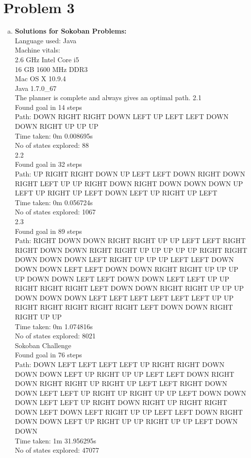 \documentclass[]{article}
\begin{document}
\section{Problem 3}
	\begin{enumerate}[(a)]
		\item \textbf{Solutions for Sokoban Problems:}\\
		Language used: Java\\
		
		Machine vitals:\\
		2.6 GHz Intel Core i5\\
		16 GB 1600 MHz DDR3\\
		Mac OS X 10.9.4\\
		Java 1.7.0\_67\\
		
		The planner is complete and always gives an optimal path.
		2.1\\
		Found goal in 14 steps\\
		Path: DOWN RIGHT RIGHT DOWN LEFT UP LEFT LEFT DOWN DOWN RIGHT UP UP UP\\
		Time taken: 0m 0.008695s\\
		No of states explored: 88\\
		
		2.2\\
		Found goal in 32 steps\\
		Path: UP RIGHT RIGHT DOWN UP LEFT LEFT DOWN RIGHT DOWN RIGHT LEFT UP UP RIGHT DOWN RIGHT DOWN DOWN DOWN UP LEFT UP RIGHT UP LEFT DOWN LEFT UP RIGHT UP LEFT\\
		Time taken: 0m 0.056724s\\
		No of states explored: 1067\\
		
		2.3\\
		Found goal in 89 steps\\
		Path: RIGHT DOWN DOWN RIGHT RIGHT UP UP LEFT LEFT RIGHT RIGHT DOWN DOWN RIGHT RIGHT UP UP UP UP UP RIGHT RIGHT DOWN DOWN DOWN LEFT RIGHT UP UP UP LEFT LEFT DOWN DOWN DOWN LEFT LEFT DOWN DOWN RIGHT RIGHT UP UP UP UP DOWN DOWN LEFT LEFT DOWN DOWN LEFT LEFT UP UP RIGHT RIGHT RIGHT LEFT DOWN DOWN RIGHT RIGHT UP UP UP DOWN DOWN DOWN LEFT LEFT LEFT LEFT LEFT LEFT UP UP RIGHT RIGHT RIGHT RIGHT RIGHT LEFT DOWN DOWN RIGHT RIGHT UP UP\\
		Time taken: 0m 1.074816s\\
		No of states explored: 8021\\
		
		Sokoban Challenge\\
		Found goal in 76 steps\\
		Path: DOWN LEFT LEFT LEFT LEFT UP RIGHT RIGHT DOWN DOWN DOWN LEFT UP RIGHT UP UP LEFT LEFT DOWN RIGHT DOWN RIGHT RIGHT UP RIGHT UP LEFT LEFT RIGHT DOWN DOWN LEFT LEFT UP RIGHT UP RIGHT UP UP LEFT DOWN DOWN DOWN LEFT LEFT UP RIGHT DOWN RIGHT UP RIGHT RIGHT DOWN LEFT DOWN LEFT RIGHT UP UP LEFT LEFT DOWN RIGHT DOWN DOWN LEFT UP RIGHT UP UP RIGHT UP UP LEFT DOWN DOWN\\
		Time taken: 1m 31.956295s\\
		No of states explored: 47077\\
		

\end{enumerate}
\end{document}
